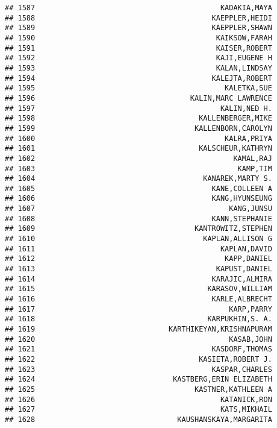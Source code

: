 \documentclass[
]{article}
\begin{document}
\begin{verbatim}
## 1587                                           KADAKIA,MAYA
## 1588                                         KAEPPLER,HEIDI
## 1589                                         KAEPPLER,SHAWN
## 1590                                          KAIKSOW,FARAH
## 1591                                          KAISER,ROBERT
## 1592                                          KAJI,EUGENE H
## 1593                                          KALAN,LINDSAY
## 1594                                         KALEJTA,ROBERT
## 1595                                            KALETKA,SUE
## 1596                                    KALIN,MARC LAWRENCE
## 1597                                           KALIN,NED H.
## 1598                                      KALLENBERGER,MIKE
## 1599                                     KALLENBORN,CAROLYN
## 1600                                            KALRA,PRIYA
## 1601                                      KALSCHEUR,KATHRYN
## 1602                                              KAMAL,RAJ
## 1603                                               KAMP,TIM
## 1604                                       KANAREK,MARTY S.
## 1605                                         KANE,COLLEEN A
## 1606                                         KANG,HYUNSEUNG
## 1607                                             KANG,JUNSU
## 1608                                         KANN,STEPHANIE
## 1609                                     KANTROWITZ,STEPHEN
## 1610                                       KAPLAN,ALLISON G
## 1611                                           KAPLAN,DAVID
## 1612                                            KAPP,DANIEL
## 1613                                          KAPUST,DANIEL
## 1614                                         KARAJIC,ALMIRA
## 1615                                        KARASOV,WILLIAM
## 1616                                         KARLE,ALBRECHT
## 1617                                             KARP,PARRY
## 1618                                        KARPUKHIN,S. A.
## 1619                               KARTHIKEYAN,KRISHNAPURAM
## 1620                                             KASAB,JOHN
## 1621                                         KASDORF,THOMAS
## 1622                                      KASIETA,ROBERT J.
## 1623                                         KASPAR,CHARLES
## 1624                                KASTBERG,ERIN ELIZABETH
## 1625                                     KASTNER,KATHLEEN A
## 1626                                           KATANICK,RON
## 1627                                           KATS,MIKHAIL
## 1628                                 KAUSHANSKAYA,MARGARITA

\end{verbatim}
\end{document}

